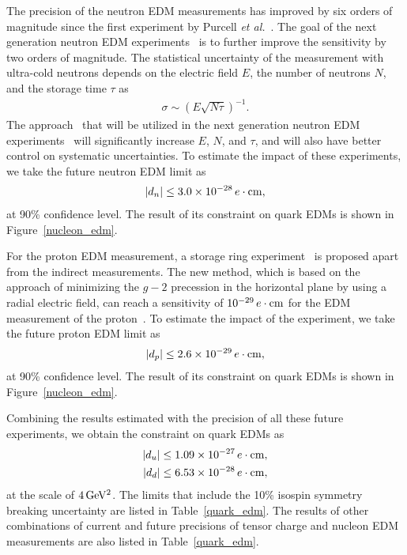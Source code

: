 \documentclass[aps,prd,twocolumn,groupedaddress,showpacs,superscriptaddress,floatfix,nofootinbib,10pt]{revtex4-1}
\begin{document}
The precision of the neutron EDM measurements has improved by six orders of magnitude since the first experiment by Purcell {\it et al.}~\cite{Purcell:1950zz,Smith:1957ht}. The goal of the next generation neutron EDM experiments~\cite{nEDMexps} is to further improve the sensitivity by two orders of magnitude. The statistical uncertainty of the measurement with ultra-cold neutrons depends on the electric field $E$, the number of neutrons $N$, and the storage time $\tau$ as~\cite{Golub:1994cg}
\begin{align}
\sigma\sim(E\sqrt{N\tau})^{-1}.
\end{align}
The approach~\cite{Golub:1994cg} that will be utilized in the next generation neutron EDM experiments~\cite{nEDMexps} will significantly increase $E$, $N$, and $\tau$, and will also have better control on systematic uncertainties. To estimate the impact of these experiments, we take the future neutron EDM limit as
\begin{align}
|d_n|\leq3.0\times10^{-28}\,e\cdot{\rm cm},
\end{align}
at 90\% confidence level. The result of its constraint on quark EDMs is shown in Figure~\ref{nucleon_edm}.

For the proton EDM measurement, a storage ring experiment~\cite{Anastassopoulos:2015ura} is proposed apart from the indirect measurements. The new method, which is based on the approach of minimizing the $g-2$ precession in the horizontal plane by using a radial electric field, can reach a sensitivity of $10^{-29}\,e\cdot{\rm cm}$ for the EDM measurement of the proton~\cite{Anastassopoulos:2015ura}. To estimate the impact of the experiment, we take the future proton EDM limit as
\begin{align}
|d_p|\leq2.6\times10^{-29}\,e\cdot{\rm cm},
\end{align}
at 90\% confidence level. The result of its constraint on quark EDMs is shown in Figure~\ref{nucleon_edm}.

Combining the results estimated with the precision of all these future experiments, we obtain the constraint on quark EDMs as
\begin{align}
|d_u|&\leq1.09\times10^{-27}\,e\cdot{\rm cm},\\
|d_d|&\leq6.53\times10^{-28}\,e\cdot{\rm cm},
\end{align}
at the scale of $4\,\rm GeV^2$. The limits that include the 10\% isospin symmetry breaking uncertainty are listed in Table~\ref{quark_edm}. The results of other combinations of current and future precisions of tensor charge and nucleon EDM measurements are also listed in Table~\ref{quark_edm}.
\end{document}

